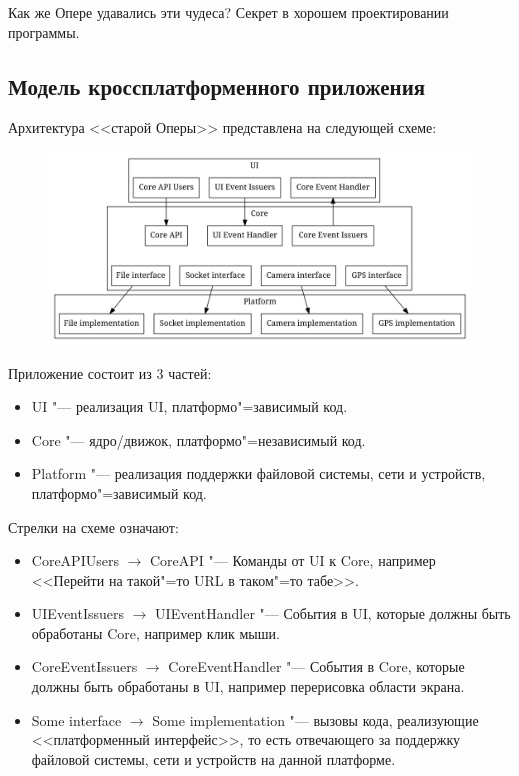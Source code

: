\documentclass[10pt, a5paper]{article}
\begin{document}
Как же Опере удавались эти чудеса? Секрет в хорошем проектировании программы.

\subsection*{Модель кроссплатформенного приложения}

Архитектура <<старой Оперы>> представлена на следующей схеме:

\begin{figure}[h!]
  \centering
  \includegraphics[scale=0.4]{08_2015_fig1}
\end{figure}

Приложение состоит из 3 частей:

\begin{itemize}
  \item UI "--- реализация UI, платформо"=зависимый код.
  \item Core "--- ядро/движок, платформо"=независимый код.
  \item Platform "--- реализация поддержки файловой системы, сети и устройств, платформо"=зависимый код.
\end{itemize}

Стрелки на схеме означают:

\begin{itemize}
  \item CoreAPIUsers $\rightarrow{}$ CoreAPI "--- Команды от UI к Core, например <<Перейти на такой"=то URL в таком"=то табе>>.
  \item UIEventIssuers $\rightarrow{}$ UIEventHandler "--- События в UI, которые должны быть обработаны Core, например клик мыши.
  \item CoreEventIssuers $\rightarrow{}$ CoreEventHandler "--- События в Core, которые должны быть обработаны в UI, например перерисовка области экрана.
  \item Some interface $\rightarrow{}$ Some implementation "--- вызовы кода, реализующие <<платформенный интерфейс>>, то есть отвечающего за поддержку файловой системы, сети и устройств на данной платформе.
\end{itemize}
\end{document}
